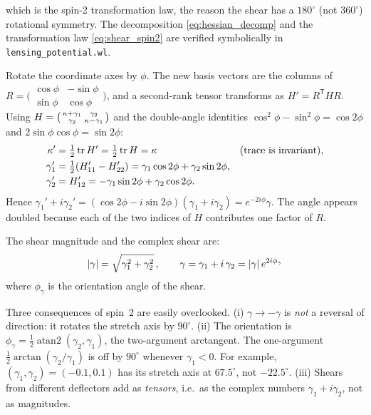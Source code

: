 which is the spin-2 transformation law, the reason the shear has a
$180^\circ$ (not $360^\circ$) rotational symmetry.  The decomposition
\eqref{eq:hessian_decomp} and the transformation law
\eqref{eq:shear_spin2} are verified symbolically in
\texttt{lensing\_potential.wl}.
\begin{derivation}
Rotate the coordinate axes by $\phi$. The new basis vectors are the columns of
$R = \bigl(\begin{smallmatrix}\cos\phi & -\sin\phi\\ \sin\phi & \cos\phi\end{smallmatrix}\bigr)$,
and a second-rank tensor transforms as $H' = R^{\mathsf T}HR$. Using
$H = \bigl(\begin{smallmatrix}\kappa+\gamma_1 & \gamma_2\\ \gamma_2 & \kappa-\gamma_1\end{smallmatrix}\bigr)$
and the double-angle identities
$\cos^2\phi - \sin^2\phi = \cos2\phi$ and $2\sin\phi\cos\phi = \sin2\phi$:
\begin{align*}
    \kappa' &= \tfrac12\operatorname{tr}H' = \tfrac12\operatorname{tr}H = \kappa
       && \text{(trace is invariant)},\\
    \gamma_1' &= \tfrac12(H'_{11} - H'_{22}) = \gamma_1\cos2\phi + \gamma_2\sin2\phi,\\
    \gamma_2' &= H'_{12} = -\gamma_1\sin2\phi + \gamma_2\cos2\phi .
\end{align*}
Hence $\gamma_1' + i\gamma_2' = (\cos2\phi - i\sin2\phi)(\gamma_1 + i\gamma_2)
= e^{-2i\phi}\gamma$. The angle appears doubled because each of the two
indices of $H$ contributes one factor of $R$.
\end{derivation}

The shear magnitude and the complex shear are:
\begin{equation}
    |\gamma| = \sqrt{\gamma_1^2 + \gamma_2^2} \,,
    \qquad
    \gamma = \gamma_1 + i\,\gamma_2 = |\gamma|\, e^{2i\phi_\gamma}
    \label{eq:shear_magnitude}
\end{equation}
where $\phi_\gamma$ is the orientation angle of the shear.
\begin{annotation}
Three consequences of spin~2 are easily overlooked. (i) $\gamma \to -\gamma$ is
\emph{not} a reversal of direction: it rotates the stretch axis by
$90^\circ$. (ii) The orientation is
$\phi_\gamma = \tfrac12\operatorname{atan2}(\gamma_2, \gamma_1)$, the
two-argument arctangent. The one-argument
$\tfrac12\arctan(\gamma_2/\gamma_1)$ is off by $90^\circ$ whenever
$\gamma_1 < 0$. For example, $(\gamma_1, \gamma_2) = (-0.1, 0.1)$ has its stretch
axis at $67.5^\circ$, not $-22.5^\circ$. (iii) Shears from different
deflectors add as \emph{tensors}, i.e.\ as the complex numbers
$\gamma_1 + i\gamma_2$, not as magnitudes.
\end{annotation}


